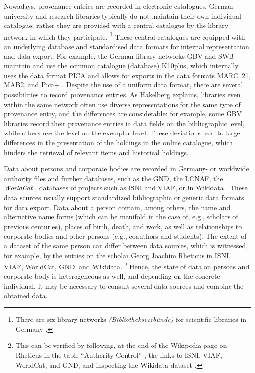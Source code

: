 Nowadays, provenance entries are recorded in electronic catalogues.
German university and research libraries typically do not
maintain their own individual catalogue; rather they are provided with a central
catalogue by the library network in which they participate.%
\footnote{%
  There are six library networks \emph{(Bibliotheksverbünde)} for scientific libraries
  in Germany %
  \autocite{WikiBibliotheksverbundDeutschland}.
}
These central catalogues are equipped with an underlying database
and standardised data formats for internal representation and data export.
%
%
For example, the German library networks \gls{GBV} and \gls{SWB} maintain and use the common catalogue (database)
%
\gls{K10plus},
which internally uses the data format PICA \autocite{PICA}
and allows for exports in the data formats
%
\gls{MARC}~21, MAB2, and Pica+ \autocite{K10plusExportformate}.
Despite the use of a uniform data format,
there are several possibilities to record provenance entries.
As Hakelberg \autocite*[§4]{Hakelberg2016} explains,
libraries even within the same network often use diverse representations
for the same type of provenance entry, and the differences are considerable:
for example, some \gls{GBV} libraries record their provenance entries
in data fields on the bibliographic level,
while others use the level on the exemplar level.
These deviations lead to large differences in the presentation
of the holdings in the online catalogue,
which hinders the retrieval of relevant items and historical holdings.

Data about persons and corporate bodies are recorded
in Germany- or worldwide authority files and further databases,
such as the \gls{GND},
the \gls{LCNAF},
the \emph{WorldCat} \autocite{WorldCat},
databases of projects such as \gls{ISNI}
and \gls{VIAF},
or in Wikidata \autocite{Wikidata}.
These data sources usually support standardized bibliographic or generic data formats for data export.
Data about a person contain, among others, the name and alternative name forms
(which can be manifold in the case of, e.g., scholars of previous centuries),
places of birth, death, and work,
as well as relationships to corporate bodies and other persons
(e.g., coauthors and students).
The extent of a dataset of the same person can differ between data sources,
which is witnessed, for example, by the entries on the scholar
Georg Joachim Rheticus in \gls{ISNI}, \gls{VIAF}, WorldCat, \gls{GND}, and Wikidata.%
\footnote{%
  This can be verified by following,
  at the end of the Wikipedia page on Rheticus
  in the table \enquote{Authority Control}
  \autocite{WikiRheticusExternalLinks},
  the links to \gls{ISNI}, \gls{VIAF}, WorldCat, and \gls{GND},
  and inspecting the Wikidata dataset
  \autocite{WikidataRheticus}.
}
Hence, the state of data on persons and corporate body is heterogeneous as well,
and depending on the concrete individual, it may be necessary
to consult several data sources and combine the obtained data.

